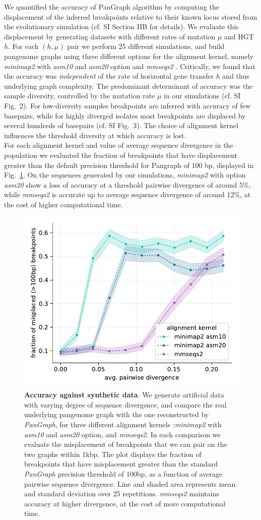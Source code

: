 \documentclass[aps,rmp,reprint,superscriptaddress,notitlepage,10pt]{revtex4-1}
\begin{document}
We quantified the accuracy of PanGraph algorithm by computing the displacement of the inferred breakpoints relative to their known locus stored from the evolutionary simulation (cf. SI Section IIB for details). We evaluate this displacement by generating datasets with different rates of mutation $\mu$ and HGT $h$. For each $(h,\mu)$ pair we perform 25 different simulations, and build pangenome graphs using three different options for the alignment kernel, namely \textit{minimap2} \cite{li2018minimap2} with \textit{asm10} and \textit{asm20} option and \textit{mmseqs2} \cite{steinegger2017mmseqs2}.
Critically, we found that the accuracy was \emph{independent} of the rate of horizontal gene transfer $h$ and thus underlying graph complexity. The predominant determinant of accuracy was the sample diversity, controlled by the mutation rate $\mu$ in our simulations (cf. SI Fig.~2). For low-diversity samples breakpoints are inferred with accuracy of few basepairs, while for highly diverged isolates most breakpoints are displaced by several hundreds of basepairs (cf. SI Fig.~3). The choice of alignment kernel influences the threshold diversity at which accuracy is lost.\\
For each alignment kernel and value of average sequence divergence in the population we evaluated the fraction of breakpoints that have displacement greater than the default precision threshold for Pangraph of 100 bp, displayed in Fig.~\ref{fig:toy-accuracy}. On the sequences generated by our simulations, \textit{minimap2} with option \textit{asm20} show a loss of accuracy at a threshold pairwise divergence of around 5\%, while \textit{mmseqs2} is accurate up to average sequence divergence of around 12\%, at the cost of higher computational time.  

\begin{figure}[htb]
    \includegraphics[width=.4\textwidth]{figs/misplaced_fraction_vs_divergence.pdf}
    \caption{{\bf Accuracy against synthetic data}.
        We generate artificial data with varying degree of sequence divergence, and compare the real underlying pangenome graph with the one reconstructed by \textit{PanGraph}, for three different alignment kernels :\textit{minimap2} with \textit{asm10} and \textit{asm20} option, and \textit{mmseqs2}. In each comparison we evaluate the misplacement of breakpoints that we can pair on the two graphs within 1kbp. The plot displays the fraction of breakpoints that have misplacement greater than the standard \textit{PanGraph} precision threshold of 100bp, as a function of average pairwise sequence divergence. Line and shaded area represents mean and standard deviation over 25 repetitions. \textit{mmseqs2} maintains accuracy at higher divergence, at the cost of more computational time.
    }
    \label{fig:toy-accuracy}
\end{figure}
\end{document}
